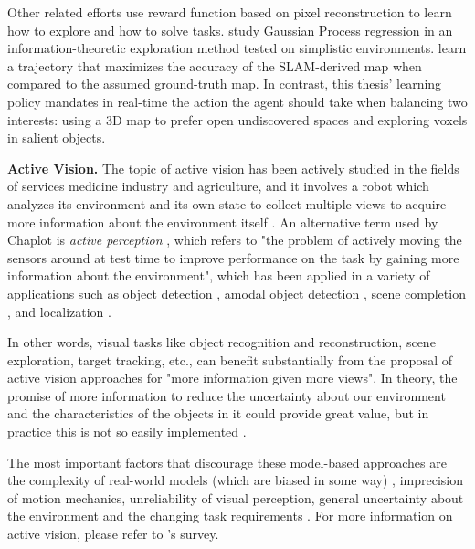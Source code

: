 Other related efforts use 
\cite{jayaraman2018learning} reward function based on pixel reconstruction to learn how to explore and how to solve tasks. 
\textcite{bai2016information} study Gaussian Process regression in an information-theoretic exploration method tested on simplistic environments.
\textcite{kollar2008trajectory} learn a trajectory that maximizes the accuracy of the SLAM-derived map when compared to the assumed ground-truth map.
In contrast, this thesis' learning policy mandates in real-time the action the agent should take when balancing two interests: using a 3D map to prefer open undiscovered spaces and exploring voxels in salient objects. 


\textbf{Active Vision.} %
The topic of active vision has been actively studied in the fields of services medicine industry and agriculture, and it involves a robot which analyzes its environment and its own state to collect multiple views to acquire more information about the environment itself \cite{zeng2020view}. An alternative term used by Chaplot is \textit{active perception} \cite{bajcsy1988active}, which refers to "the problem of actively moving the sensors around at test time to improve performance on the task by gaining more information about the environment", which has been applied in a variety of applications such as object detection \cite{ammirato2017dataset}, amodal object detection \cite{yang2019embodied}, scene completion
\cite{jayaraman2018learning}, and localization \cite{chaplot2018active, fox1998active}. 

In other words, visual tasks like object recognition and reconstruction, scene exploration, target tracking, etc., can benefit substantially from the proposal of active vision approaches for "more information given more views". 
In theory, the promise of more information to reduce the uncertainty about our environment and the characteristics of the objects in it could provide great value, but in practice this is not so easily implemented \cite{zeng2020view}.

The most important factors that discourage these model-based approaches are the complexity of real-world models (which are biased in some way) \cite{wang2018look}, imprecision of motion mechanics, unreliability of visual perception, general uncertainty about the environment and the changing task requirements \cite{vasquez2017view, palomeras2019autonomous}. For more information on active vision, please refer to \textcite{zeng2020view}'s survey.

